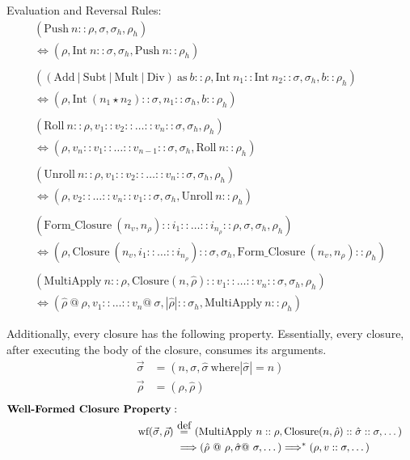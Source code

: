 \documentclass[11pt]{article}
\newcommand\myeq{\stackrel{\mathclap{\normalfont\mbox{def}}}{=}}
\begin{document}
Evaluation and Reversal Rules:
\begin{gather*}
    (\text{Push}\ n::\rho, \sigma, \sigma_h, \rho_h)\\
    \Longleftrightarrow (\rho, \text{Int}\ n::\sigma, \sigma_h, \text{Push}\ n::\rho_h) \\ \\
    ((\text{Add}\ |\ \text{Subt}\ |\ \text{Mult}\ |\ \text{Div})\ \text{as}\ b::\rho, \text{Int}\ n_1::\text{Int}\ n_2::\sigma, \sigma_h, b::\rho_h)\\
    \Longleftrightarrow (\rho, \text{Int}\ (n_1 \star n_2)::\sigma, n_1::\sigma_h, b::\rho_h)\\ \\
    (\text{Roll}\ n::\rho, v_1::v_2::\dots::v_n::\sigma, \sigma_h, \rho_h)\\
    \Longleftrightarrow (\rho, v_n::v_1::\dots::v_{n-1}::\sigma, \sigma_h, \text{Roll}\ n::\rho_h)\\ \\
    (\text{Unroll}\ n::\rho, v_1::v_2::\dots::v_n::\sigma, \sigma_h, \rho_h)\\
    \Longleftrightarrow (\rho, v_2::\dots::v_n::v_1::\sigma, \sigma_h, \text{Unroll}\ n::\rho_h)\\ \\
    (\text{Form\_Closure}\ (n_v, n_{\rho})::i_1::\dots::i_{n_\rho}::\rho, \sigma, \sigma_h, \rho_h) \\
    \Longleftrightarrow (\rho, \text{Closure}\ (n_v, i_1::\dots::i_{n_{\rho}})::\sigma, \sigma_h, \text{Form\_Closure}\ (n_v, n_{\rho})::\rho_h)\\ \\
    (\text{MultiApply}\ n::\rho, \text{Closure} (n, \hat{\rho})::v_1::\dots::v_n::\sigma, \sigma_h, \rho_h) \\
    \Longleftrightarrow (\hat{\rho}\ @\ \rho, v_1::\dots::v_n @\ \sigma, |\hat{\rho}|::\sigma_h, \text{MultiApply}\ n::\rho_h)
\end{gather*}

Additionally, every closure has the following property. Essentially, every closure, after executing the body of the closure, consumes its arguments.
\begin{align*}
    \vec{\sigma} &= (n, \sigma, \hat{\sigma}\ \text{where} |\hat{\sigma}| = n)\\
    \vec{\rho} &= (\rho, \hat{\rho})
\end{align*}
\begin{align*}
\textbf{Well-Formed Closure Property}: \\
    \text{wf} (\vec{\sigma}, \vec{\rho})\ &\myeq\ (\text{MultiApply}\ n::\rho, \text{Closure} (n, \hat{\rho})::\hat{\sigma}::\sigma, \dots)\\
    &\Longrightarrow (\hat{\rho}\ @\ \rho, \hat{\sigma} @\ \sigma, \dots) \Longrightarrow^* (\rho, v::\sigma, \dots)
\end{align*}
\end{document}
